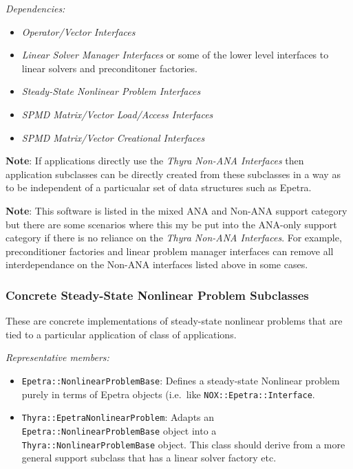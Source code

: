 \documentclass[pdf,ps2pdf,11pt]{SANDreport}
\begin{document}
{}\textit{Dependencies:}
\begin{itemize}
\item {}\textit{Operator/Vector Interfaces}
\item {}\textit{Linear Solver Manager Interfaces} or some of the 
lower level interfaces to linear solvers and preconditoner factories.
\item {}\textit{Steady-State Nonlinear Problem Interfaces}
\item {}\textit{SPMD Matrix/Vector Load/Access Interfaces}
\item {}\textit{SPMD Matrix/Vector Creational Interfaces}
\end{itemize}

{}\textbf{Note}: If applications directly use the {}\textit{Thyra Non-ANA
Interfaces} then application subclasses can be directly created from these
subclasses in a way as to be independent of a particualar set of data
structures such as Epetra.

{}\textbf{Note}: This software is listed in the mixed ANA and Non-ANA support
category but there are some scenarios where this my be put into the ANA-only
support category if there is no reliance on the {}\textit{Thyra Non-ANA
Interfaces}.  For example, preconditioner factories and linear problem manager
interfaces can remove all interdependance on the Non-ANA interfaces listed
above in some cases.

%
\subsubsection{Concrete Steady-State Nonlinear Problem Subclasses}
%

These are concrete implementations of steady-state nonlinear problems that are
tied to a particular application of class of applications.

{}\textit{Representative members:}
\begin{itemize}
%
{}\item {}\texttt{Epetra::NonlinearProblemBase}: Defines a steady-state
Nonlinear problem purely in terms of Epetra objects (i.e.\ like
{}\texttt{NOX\-::Epetra\-::Interface}.
%
{}\item {}\texttt{Thyra::EpetraNonlinearProblem}: Adapts an
{}\texttt{Epetra\-::Nonlinear\-Problem\-Base} object into a
{}\texttt{Thyra\-::Nonlinear\-Problem\-Base} object.  This class should derive
from a more general support subclass that has a linear solver factory etc.
%
\end{itemize}
\end{document}

